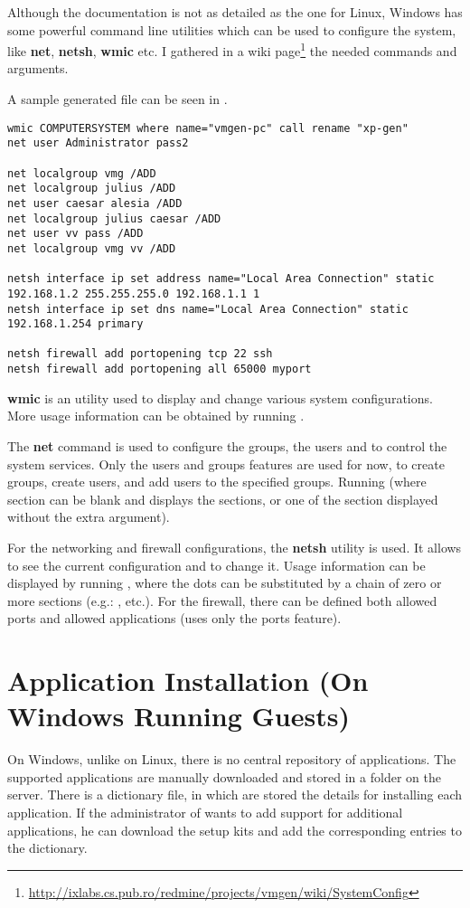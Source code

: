 Although the documentation is not as detailed as the one for Linux, Windows has
some powerful command line utilities which can be used to configure the system,
like \textbf{net}, \textbf{netsh}, \textbf{wmic} etc. I gathered in a wiki
page\footnote{\url{http://ixlabs.cs.pub.ro/redmine/projects/vmgen/wiki/SystemConfig}}
the needed commands and arguments.

A sample generated  file can be seen in
.

\lstset{caption=Sample generated config.bat,label=lst:config-bat}
\begin{lstlisting}
wmic COMPUTERSYSTEM where name="vmgen-pc" call rename "xp-gen"
net user Administrator pass2

net localgroup vmg /ADD
net localgroup julius /ADD
net user caesar alesia /ADD
net localgroup julius caesar /ADD
net user vv pass /ADD
net localgroup vmg vv /ADD

netsh interface ip set address name="Local Area Connection" static 192.168.1.2 255.255.255.0 192.168.1.1 1
netsh interface ip set dns name="Local Area Connection" static 192.168.1.254 primary

netsh firewall add portopening tcp 22 ssh
netsh firewall add portopening all 65000 myport
\end{lstlisting}

\textbf{wmic} is an utility used to display and change various system
configurations. More usage information can be obtained by running .

The \textbf{net} command is used to configure the groups, the users and to
control the system services. Only the users and groups features are used for
now, to create groups, create users, and add users to the specified groups.
Running  (where section can be blank and displays the
sections, or one of the section displayed without the extra argument).

For the networking and firewall configurations, the \textbf{netsh} utility is
used. It allows to see the current configuration and to change it. Usage
information can be displayed by running , where the
dots can be substituted by a chain of zero or more sections (e.g.:
,  etc.). For the firewall, there
can be defined both allowed ports and allowed applications (\project uses only
the ports feature).


\section{Application Installation (On Windows Running Guests)}
\label{sec:vmware-apps-win}
On Windows, unlike on Linux, there is no central repository of applications.
The supported applications are manually downloaded and stored in a folder on
the server. There is a dictionary file, in which are stored the details for
installing each application. If the administrator of \project wants to add
support for additional applications, he can download the setup kits and add the
corresponding entries to the dictionary.

